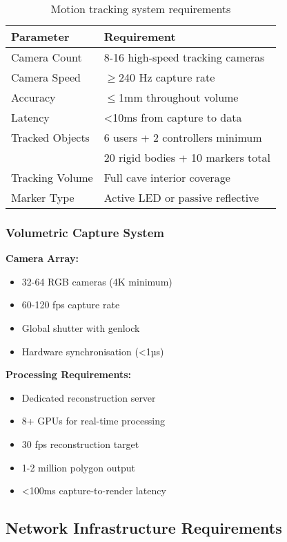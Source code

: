 \begin{table}[h]
\centering
\begin{tabular}{|l|l|}
\hline
\textbf{Parameter} & \textbf{Requirement} \\
\hline
Camera Count & 8-16 high-speed tracking cameras \\
\hline
Camera Speed & $\geq$240 Hz capture rate \\
\hline
Accuracy & $\leq$1mm throughout volume \\
\hline
Latency & <10ms from capture to data \\
\hline
Tracked Objects & 6 users + 2 controllers minimum \\
 & 20 rigid bodies + 10 markers total \\
\hline
Tracking Volume & Full cave interior coverage \\
\hline
Marker Type & Active LED or passive reflective \\
\hline
\end{tabular}
\caption{Motion tracking system requirements}
\end{table}

\subsubsection{Volumetric Capture System}

\textbf{Camera Array:}
\begin{itemize}
    \item 32-64 RGB cameras (4K minimum)
    \item 60-120 fps capture rate
    \item Global shutter with genlock
    \item Hardware synchronisation (<1µs)
\end{itemize}

\textbf{Processing Requirements:}
\begin{itemize}
    \item Dedicated reconstruction server
    \item 8+ GPUs for real-time processing
    \item 30 fps reconstruction target
    \item 1-2 million polygon output
    \item <100ms capture-to-render latency
\end{itemize}

\subsection{Network Infrastructure Requirements}

